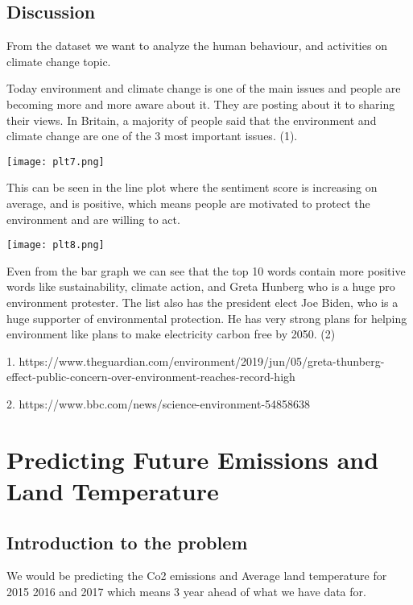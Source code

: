 \documentclass[a4paper, 11pt]{report}
\begin{document}
\subsection{Discussion}

From the dataset we want to analyze the human behaviour, and activities on climate change topic.

Today environment and climate change is one of the main issues and people are becoming more and more aware about it. They are posting about it to sharing their views. In Britain, a majority  of people said that the environment and climate change are one of the 3 most important issues. (1).

\begin{multicols}{2}
  \texttt{[image: plt7.png]}

  This can be seen in the line plot where the sentiment score is increasing on average, and is positive, which means people are motivated to protect the environment and are willing to act.
\end{multicols}






  \texttt{[image: plt8.png]}


    Even from the bar graph we can see that the top 10 words contain more positive words like sustainability, climate action, and Greta Hunberg who is a huge pro environment protester. The list also has the president elect Joe Biden, who is a huge supporter of environmental protection. He has very strong plans for helping environment like plans to make electricity carbon free by 2050. (2)

\scriptsize
1. https://www.theguardian.com/environment/2019/jun/05/greta-thunberg-effect-public-concern-over-environment-reaches-record-high

2. https://www.bbc.com/news/science-environment-54858638
\normalsize
\newpage
\section{Predicting Future Emissions and Land Temperature}

\subsection{Introduction to the problem}

We would be predicting the Co2 emissions and Average land temperature for 2015 2016 and 2017 which means 3 year ahead of what we have data for. \\
\end{document}
